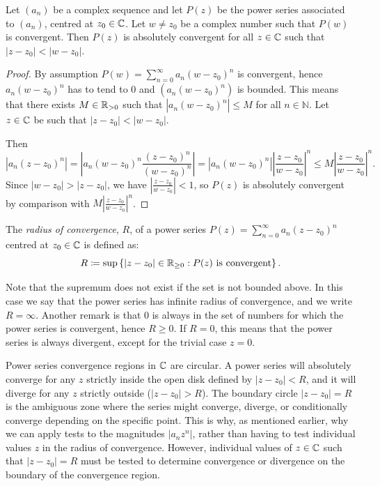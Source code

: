 \documentclass[../analysis1.tex]{subfiles}
\begin{document}
\begin{lemma}
\label{lem:radiuslemma}
    \begin{shaded*}
        Let $(a_n)$ be a complex sequence and let $P(z)$ be the power series associated to $(a_n)$, centred at $z_0\in\mathbb{C}$. Let $w\ne z_0$ be a complex number such that $P(w)$ is convergent. Then $P(z)$ is absolutely convergent for all $z\in\mathbb{C}$ such that $|z-z_0|<|w-z_0|$.
    \end{shaded*}
\end{lemma}
\begin{proof}
By assumption $P(w) = \sum_{n=0}^{\infty} a_n (w - z_0)^n$ is convergent, hence $a_n (w - z_0)^n$ has to tend to $0$ and $(a_n (w - z_0)^n)$ is bounded. This means that there exists $M\in\mathbb{R}_{>0}$ such that $|a_n (w - z_0)^n| \leq M$ for all $n \in \mathbb{N}$. Let $z\in\mathbb{C}$ be such that $|z-z_0|<|w-z_0|$.

Then
\[
|a_n (z - z_0)^n| = \left| a_n (w - z_0)^n \frac{(z - z_0)^n}{(w - z_0)^n} \right| = |a_n (w - z_0)^n| \left| \frac{z - z_0}{w - z_0} \right|^n \leq M \left|\frac{z-z_0}{w-z_0}\right|^n.
\]
Since $|w - z_0| > |z - z_0|$, we have $\left|\frac{z-z_0}{w-z_0}\right|<1$, so $P(z)$ is absolutely convergent by comparison with $M\left|\frac{z-z_0}{w-z_0}\right|^n$.
\end{proof}

\begin{definition}
    \begin{shaded*}
        The \textit{radius of convergence}, $R$, of a power series $P(z) = \sum_{n=0}^{\infty} a_n (z-z_0)^n$ centred at $z_0\in\mathbb{C}$ is defined as: $$R\coloneqq\sup\left\{|z-z_0|\in\mathbb{R}_{\ge 0}:P(z)\text{ is convergent}\right\}.$$
    \end{shaded*}
\end{definition}
Note that the supremum does not exist if the set is not bounded above. In this case we say that the power series has infinite radius of convergence, and we write $R=\infty$.
Another remark is that 0 is always in the set of numbers for which the power series is convergent, hence $R\ge 0$. If $R=0$, this means that the power series is always divergent, except for the trivial case $z=0$.

\begin{remark}
    Power series convergence regions in $\mathbb{C}$ are circular. A power series will absolutely converge for any $z$ strictly inside the open disk defined by $|z - z_0| < R$, and it will diverge for any $z$ strictly outside ($|z - z_0| > R$). The boundary circle $|z - z_0| = R$ is the ambiguous zone where the series might converge, diverge, or conditionally converge depending on the specific point. This is why, as mentioned earlier, why we can apply tests to the magnitudes $|a_nz^n|$, rather than having to test individual values $z$ in the radius of convergence. However, individual values of $z\in\mathbb{C}$ such that $|z-z_0|=R$ must be tested to determine convergence or divergence on the boundary of the convergence region.
\end{remark}
\end{document}
